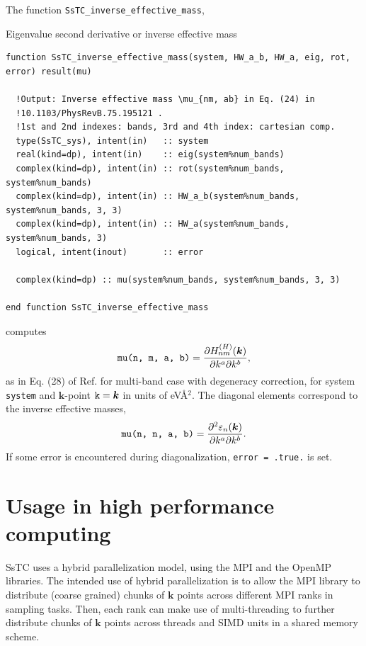 \documentclass[10pt,a4paper]{article}
\begin{document}
The function \verb|SsTC_inverse_effective_mass|,
\begin{codebox}{Eigenvalue second derivative or inverse effective mass}
\begin{lstlisting}[caption={Interface of ``Inverse effective mass".},captionpos=b]
function SsTC_inverse_effective_mass(system, HW_a_b, HW_a, eig, rot, error) result(mu)

  !Output: Inverse effective mass \mu_{nm, ab} in Eq. (24) in
  !10.1103/PhysRevB.75.195121 .
  !1st and 2nd indexes: bands, 3rd and 4th index: cartesian comp.
  type(SsTC_sys), intent(in)   :: system
  real(kind=dp), intent(in)    :: eig(system%num_bands)
  complex(kind=dp), intent(in) :: rot(system%num_bands, system%num_bands)
  complex(kind=dp), intent(in) :: HW_a_b(system%num_bands, system%num_bands, 3, 3)
  complex(kind=dp), intent(in) :: HW_a(system%num_bands, system%num_bands, 3)
  logical, intent(inout)       :: error

  complex(kind=dp) :: mu(system%num_bands, system%num_bands, 3, 3)

end function SsTC_inverse_effective_mass
\end{lstlisting}
\end{codebox}
computes
\begin{equation}
\verb|mu(n, m, a, b)| = \frac{\partial H_{nm}^{(H)}(\bm{k})}{\partial k^a \partial k^b},
\end{equation}
as in Eq. (28) of Ref. \cite{yatesSpectralFermiSurface2007} for multi-band case with degeneracy correction, for system \verb|system| and $\bm{k}$-point $\verb|k| = \bm{k}$ in units of eV\r{A}$^2$. The diagonal elements correspond to the inverse effective masses,
\begin{equation}
\verb|mu(n, n, a, b)| = \frac{\partial^2\varepsilon_n(\bm{k})}{\partial k^a\partial k^b}.
\end{equation}
If some error is encountered during diagonalization, \verb|error = .true.| is set.
\section{Usage in high performance computing}
SsTC uses a hybrid parallelization model, using the MPI \cite{messagepassinginterfaceforumMPIMessagePassingInterface2021} and the OpenMP \cite{openmparchitecturereviewboardOpenMPApplicationProgramming2021} libraries. The intended use of hybrid parallelization is to allow the MPI library to distribute (coarse grained) chunks of $\bm{k}$ points across different MPI ranks in sampling tasks. Then, each rank can make use of multi-threading to further distribute chunks of $\bm{k}$ points across threads and SIMD units in a shared memory scheme.
\end{document}
